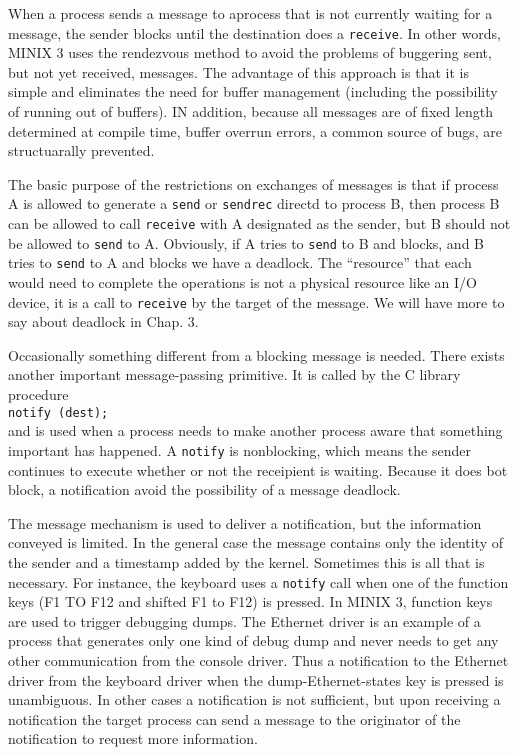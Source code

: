 \documentclass{book}
\newcommand {\cmd} [1] {\texttt{#1}}
\begin{document}
When a process sends a message to aprocess that is not currently waiting for a message,
the sender blocks until the destination does a \cmd{receive}.
In other words, MINIX 3 uses the rendezvous method to avoid the problems of buggering sent, but not yet received, messages.
The advantage of this approach is that it is simple and eliminates the need for buffer management (including the possibility of running out of buffers).
IN addition, because all messages are of fixed length determined at compile time,
buffer overrun errors, a common source of bugs, are structuarally prevented.

The basic purpose of the restrictions on exchanges of messages is that 
if process A is allowed to generate a \cmd{send} or \cmd{sendrec} directd to process B,
then process B can be allowed to call \cmd{receive} with A designated as the sender, but B should not be allowed to \cmd{send} to A.
Obviously, if A tries to \cmd{send} to B and blocks, and B tries to \cmd{send} to A and blocks we have a deadlock.
The ``resource'' that each would need to complete the operations is not a physical resource like an I/O device,
it is a call to \cmd{receive} by the target of the message.
We will have more to say about deadlock in Chap. 3.

Occasionally something different from a blocking message is needed.
There exists another important message-passing primitive.
It is called by the C library procedure\\
\cmd{notify (dest);}\\
and is used when a process needs to make another process aware that something important has happened.
A \cmd{notify} is nonblocking, which means the sender continues to execute whether or not the receipient is waiting.
Because it does bot block, a notification avoid the possibility of a message deadlock.

The message mechanism is used to deliver a notification, but the information conveyed is limited.
In the general case the message contains only the identity of the sender and a timestamp added by the kernel.
Sometimes this is all that is necessary.
For instance, the keyboard uses a \cmd{notify} call when one of the function keys (F1 TO F12 and shifted F1 to F12) is pressed.
In MINIX 3, function keys are used to trigger debugging dumps.
The Ethernet driver is an example of a process that generates only one kind of debug dump 
and never needs to get any other communication from the console driver.
Thus a notification to the Ethernet driver from the keyboard driver when the dump-Ethernet-states key is pressed is unambiguous.
In other cases a notification is not sufficient, 
but upon receiving a notification the target process can send a message to the originator of the notification to request more information.
\end{document}
